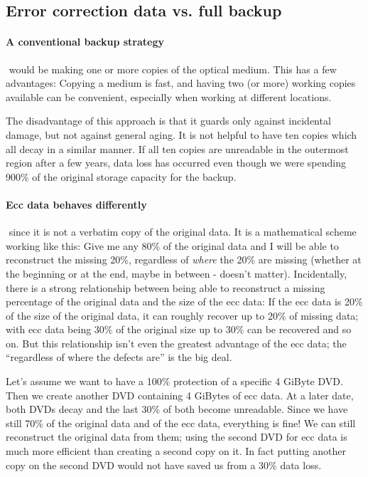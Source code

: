 \subsection{Error correction data vs. full backup}
\label{overview-backup}

\paragraph{A conventional backup strategy}$\!\!\!\!\!$ would be making one or 
more copies of the optical medium. This has a few advantages:
Copying a medium is fast, and having two (or more) working copies
available can be convenient, especially when working at different
locations.

\smallskip

The disadvantage of this approach is that it guards only against
incidental damage, but not against general aging. It is not helpful
to have ten copies which all decay in a similar manner. If all 
ten copies are unreadable in the outermost region after a few years,
data loss has occurred even though we were spending 900\% of the
original storage capacity for the backup.

\paragraph{Ecc data behaves differently}$\!\!\!\!\!$ since it is not a verbatim
copy of the original data. It is a mathematical scheme working like
this: Give me any 80\% of the original data and I will be able to
reconstruct the missing 20\%, regardless of {\em where} the 20\%
are missing (whether at the beginning or at the end, maybe in between - doesn't
matter). Incidentally, there is a strong relationship between 
being able to reconstruct a missing percentage of the original data 
and the size of the ecc data: If the ecc data is 20\% of the size of
the original data, it can roughly recover up to 20\% of missing data;
with ecc data being 30\% of the original size up to 30\% can be recovered
and so on. But this relationship isn't even the greatest advantage
of the ecc data; the ``regardless of where the defects are'' is the big deal.

\smallskip

Let's assume we want to have a 100\% protection of a specific 4 GiByte 
DVD. Then we create another DVD containing 4 GiBytes of ecc data. 
At a later date, both DVDs decay and the last 30\% of both become
unreadable. Since we have still 70\% of the original data and of the
ecc data, everything is fine! We can still reconstruct the original 
data from them; using the second DVD for ecc data is much more
efficient than creating a second copy on it. In fact putting another
copy on the second DVD would not have saved us from a 30\% data loss.

